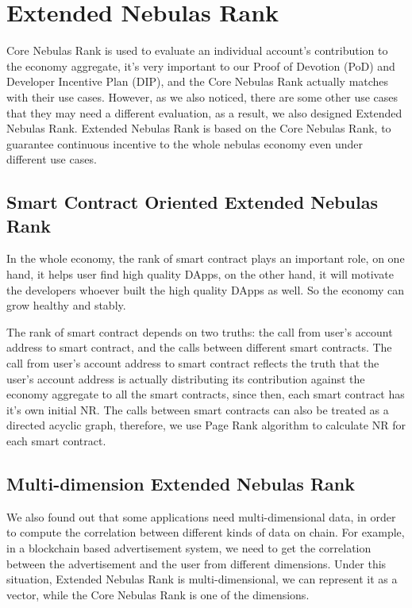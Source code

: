 \section{Extended Nebulas Rank}
Core Nebulas Rank is used to evaluate an individual account’s contribution to the economy aggregate, it’s very important to our Proof of Devotion (PoD) and Developer Incentive Plan (DIP), and the Core Nebulas Rank actually matches with their use cases. However, as we also noticed, there are some other use cases that they may need a different evaluation, as a result, we also designed Extended Nebulas Rank. Extended Nebulas Rank is based on the Core Nebulas Rank, to guarantee continuous incentive to the whole nebulas economy even under different use cases.

\subsection{Smart Contract Oriented Extended Nebulas Rank}
In the whole economy, the rank of smart contract plays an important role, on one hand, it helps user find high quality DApps, on the other hand, it will motivate the developers whoever built the high quality DApps as well. So the economy can grow healthy and stably.

The rank of smart contract depends on two truths: the call from user’s account address to smart contract, and the calls between different smart contracts. The call from user’s account address to smart contract reflects the truth that the user’s account address is actually distributing its contribution against the economy aggregate to all the smart contracts, since then, each smart contract has it’s own initial NR. The calls between smart contracts can also be treated as a directed acyclic graph, therefore, we use Page Rank algorithm to calculate NR for each smart contract.


\subsection{Multi-dimension Extended Nebulas Rank}
We also found out that some applications need multi-dimensional data, in order to compute the correlation between different kinds of data on chain. For example, in a blockchain based advertisement system, we need to get the correlation between the advertisement and the user from different dimensions. Under this situation, Extended Nebulas Rank is multi-dimensional, we can represent it as a vector, while the Core Nebulas Rank is one of the dimensions.

